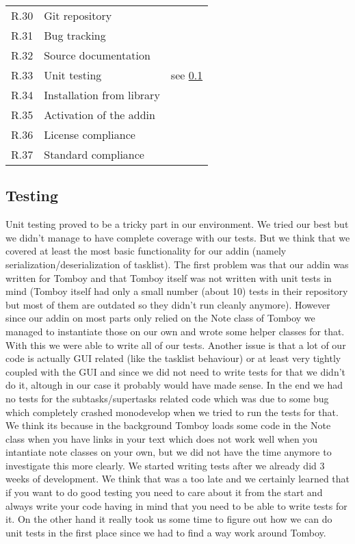 \begin{tabular}{lll}
\completed	R.30	& Git repository & \\
\completed	R.31	& Bug tracking & \\
\completed	R.32	& Source documentation & \\
\parts		R.33	& Unit testing & see \ref{testing}\\
\completed	R.34	& Installation from library & \\
\completed	R.35	& Activation of the addin & \\
\completed	R.36	& License compliance & \\
\completed	R.37	& Standard compliance & \\
\end{tabular}


\subsection{Testing}
\label{testing}
Unit testing proved to be a tricky part in our environment. We tried our best but we didn't manage to have complete coverage with our tests. But we think that we covered at least the most basic functionality for our addin (namely serialization/deserialization of tasklist).
The first problem was that our addin was written for Tomboy and that Tomboy itself was not written with unit tests in mind (Tomboy itself had only a small number (about 10) tests in their repository but most of them are outdated so they didn't run cleanly anymore). However since our addin on most parts only relied on the Note class of Tomboy we managed to instantiate those on our own and wrote some helper classes for that. With this we were able to write all of our tests.
Another issue is that a lot of our code is actually GUI related (like the tasklist behaviour) or at least very tightly coupled with the GUI and since we did not need to write tests for that we didn't do it, altough in our case it probably would have made sense.
In the end we had no tests for the subtasks/supertasks related code which was due to some bug which completely crashed monodevelop when we tried to run the tests for that. We think its because in the background Tomboy loads some code in the Note class when you have links in your text which does not work well when you intantiate note classes on your own, but we did not have the time anymore to investigate this more clearly.
We started writing tests after we already did 3 weeks of development. We think that was a too late and we certainly learned that if you want to do good testing you need to care about it from the start and always write your code having in mind that you need to be able to write tests for it. On the other hand it really took us some time to figure out how we can do unit tests in the first place since we had to find a way work around Tomboy.